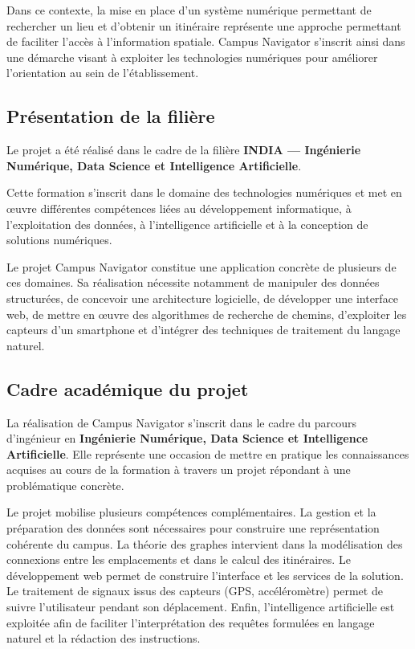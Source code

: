 \documentclass[12pt,a4paper]{report}
\begin{document}
Dans ce contexte, la mise en place d'un système numérique permettant de rechercher un lieu et
d'obtenir un itinéraire représente une approche permettant de faciliter l'accès à l'information
spatiale. Campus Navigator s'inscrit ainsi dans une démarche visant à exploiter les technologies
numériques pour améliorer l'orientation au sein de l'établissement.

\subsection{Présentation de la filière}

Le projet a été réalisé dans le cadre de la filière \textbf{INDIA — Ingénierie Numérique, Data
Science et Intelligence Artificielle}.

Cette formation s'inscrit dans le domaine des technologies numériques et met en œuvre différentes
compétences liées au développement informatique, à l'exploitation des données, à l'intelligence
artificielle et à la conception de solutions numériques.

Le projet Campus Navigator constitue une application concrète de plusieurs de ces domaines. Sa
réalisation nécessite notamment de manipuler des données structurées, de concevoir une
architecture logicielle, de développer une interface web, de mettre en œuvre des algorithmes de
recherche de chemins, d'exploiter les capteurs d'un smartphone et d'intégrer des techniques de
traitement du langage naturel.

\subsection{Cadre académique du projet}

La réalisation de Campus Navigator s'inscrit dans le cadre du parcours d'ingénieur en
\textbf{Ingénierie Numérique, Data Science et Intelligence Artificielle}. Elle représente une
occasion de mettre en pratique les connaissances acquises au cours de la formation à travers un
projet répondant à une problématique concrète.

Le projet mobilise plusieurs compétences complémentaires. La gestion et la préparation des
données sont nécessaires pour construire une représentation cohérente du campus. La théorie des
graphes intervient dans la modélisation des connexions entre les emplacements et dans le calcul
des itinéraires. Le développement web permet de construire l'interface et les services de la
solution. Le traitement de signaux issus des capteurs (GPS, accéléromètre) permet de suivre
l'utilisateur pendant son déplacement. Enfin, l'intelligence artificielle est exploitée afin de
faciliter l'interprétation des requêtes formulées en langage naturel et la rédaction des
instructions.
\end{document}
